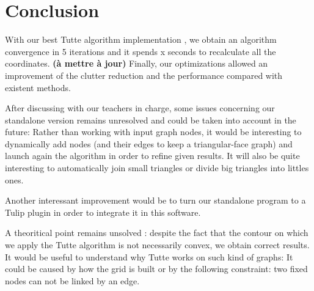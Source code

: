 \chapter*{Conclusion}


With our best Tutte algorithm implementation , we obtain an algorithm convergence in 5 iterations and it spends x seconds to recalculate all the coordinates. \textbf{(à mettre à jour)}
Finally, our optimizations allowed an improvement of the clutter reduction and the performance compared with existent methods.


After discussing with our teachers in charge, some issues concerning our standalone version remains unresolved and could be taken into account in the future: Rather than working with input graph nodes, it would be interesting to dynamically add nodes (and their edges to keep a triangular-face graph) and launch again the algorithm in order to refine given results. It will also be quite interesting to automatically join small triangles or divide big triangles into littles ones.

Another interessant improvement would be to turn our standalone program to a Tulip plugin in order to integrate it in this software.
 
A theoritical point remains unsolved : despite the fact that the contour on which we apply the Tutte algorithm is not necessarily convex, we obtain correct results. It would be useful to understand why Tutte works on such kind of graphs: It could be caused by how the grid is built or by the following constraint: two fixed nodes can not be linked by an edge.


